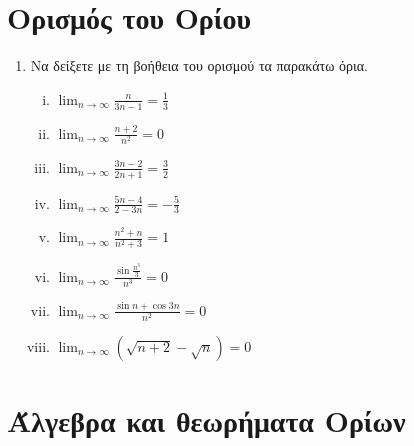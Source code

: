 


\everymath{\displaystyle}
\pagestyle{vangelis}



\begin{center}
  \minibox[c]{\large \bfseries \textcolor{Col1}{Ακολουθίες}\\ \large 
  \textcolor{Col1}{Ασκήσεις}}
\end{center}

\vspace{\baselineskip}


\setcounter{chapter}{1}


\section{Ορισμός του Ορίου}

\begin{enumerate}
  \item Να δείξετε με τη βοήθεια του ορισμού τα παρακάτω όρια.
    \begin{enumerate}[i)]
      \item $ \lim_{n \to \infty} \frac{n}{3n-1} = \frac{1}{3} $
      \item $ \lim_{n \to \infty} \frac{n+2}{n^{2}} = 0 $
      \item $ \lim_{n \to \infty} \frac{3n -2}{2n+1} = \frac{3}{2} $ 
      \item $ \lim_{n \to \infty} \frac{5n-4}{2-3n} = - \frac{5}{3} $ 
      \item $ \lim_{n \to \infty} \frac{n^{2}+n}{n^{2}+3} = 1 $ 
      \item $ \lim_{n \to \infty} \frac{\sin{\frac{n^{3}}{3}}}{n^{3}}=0 $
      \item $ \lim_{n \to \infty} \frac{\sin{n} + \cos{3n}}{n^{2}} = 0 $
      \item $ \lim_{n \to \infty} (\sqrt{n+2} - \sqrt{n}) = 0 $
    \end{enumerate}
\end{enumerate}


\section{Άλγεβρα και θεωρήματα Ορίων}

